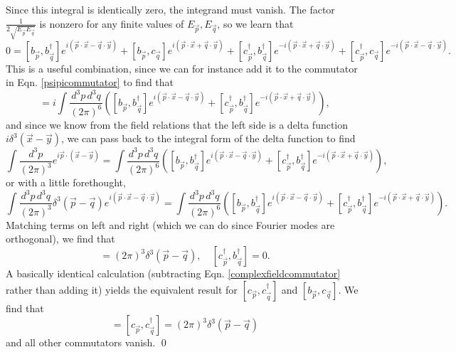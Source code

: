 Since this integral is identically zero, the integrand must vanish. The factor $\frac{1}{2\sqrt{E_{\vec p} E_{\vec q}}}$ is nonzero for any finite values of $E_{\vec p},E_{\vec q}$, so we learn that 
\begin{equation}\label{complexfieldcommutator}
    0=[b_{\vec p}, b_{\vec q}^\dagger] e^{i(\vec p \cdot \vec x -\vec q \cdot \vec y)} + [b_{\vec p},c_{\vec q}] e^{i(\vec p \cdot \vec x + \vec q \cdot \vec y)}
    + [c_{\vec p}^\dagger, b_{\vec q}^\dagger] e^{-i(\vec p \cdot \vec x + \vec q \cdot \vec y)} + [c_{\vec p}^\dagger,c_{\vec q}] e^{-i(\vec p\cdot \vec x - \vec q \cdot \vec y)}.
\end{equation}
This is a useful combination, since we can for instance add it to the commutator in Eqn. \ref{psipicommutator} to find that
\begin{equation}
    [\psi(\vec x),\pi(\vec y)]=i \int \frac{d^3p\, d^3q}{(2\pi)^6} 
    \left([b_{\vec p}, b_{\vec q}^\dagger] e^{i(\vec p \cdot \vec x -\vec q \cdot \vec y)} +[c_{\vec p}^\dagger, b_{\vec q}^\dagger] e^{-i(\vec p \cdot \vec x + \vec q \cdot \vec y)}\right),
\end{equation}
and since we know from the field relations that the left side is a delta function $i\delta^3(\vec x- \vec y)$, we can pass back to the integral form of the delta function to find
\begin{equation*}
    \int \frac{d^3p}{(2\pi)^3} e^{i \vec p\cdot (\vec x - \vec y)}=\int \frac{d^3p\, d^3q}{(2\pi)^6} 
    \left([b_{\vec p}, b_{\vec q}^\dagger] e^{i(\vec p \cdot \vec x -\vec q \cdot \vec y)} +[c_{\vec p}^\dagger, b_{\vec q}^\dagger] e^{-i(\vec p \cdot \vec x + \vec q \cdot \vec y)}\right),
\end{equation*}
or with a little forethought,
\begin{equation*}
    \int \frac{d^3p\, d^3 q}{(2\pi)^3} \delta^3(\vec p-\vec q) 
    e^{i (\vec p\cdot \vec x - \vec q \cdot\vec y)}
    =\int \frac{d^3p\, d^3q}{(2\pi)^6} 
    \left([b_{\vec p}, b_{\vec q}^\dagger] e^{i(\vec p \cdot \vec x -\vec q \cdot \vec y)} +[c_{\vec p}^\dagger, b_{\vec q}^\dagger] e^{-i(\vec p \cdot \vec x + \vec q \cdot \vec y)}\right).
\end{equation*}
Matching terms on left and right (which we can do since Fourier modes are orthogonal), we find that
\begin{equation*}
    [b_{\vec p},b_{\vec q}^\dagger]=(2\pi)^3 \delta^3(\vec p -\vec q), \quad [c_{\vec p}^\dagger,b_{\vec q}^\dagger]=0.
\end{equation*}
A basically identical calculation (subtracting Eqn. \ref{complexfieldcommutator} rather than adding it) yields the equivalent result for $[c_{\vec p},c_{\vec q}^\dagger]$ and $[b_{\vec p},c_{\vec q}]$. We find that
\begin{equation*}
    [b_{\vec p},b_{\vec q}^\dagger]=[c_{\vec p},c_{\vec q}^\dagger]=(2\pi)^3 \delta^3(\vec p -\vec q)
\end{equation*}
and all other commutators vanish. \qed

